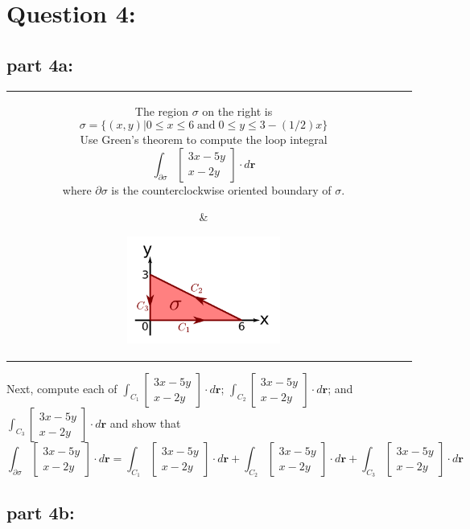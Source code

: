 \documentclass{article}
\newcommand{\colxyvec}[2]{\begin{bmatrix} #1 \\ #2 \end{bmatrix}}
\begin{document}
\section*{Question 4:}

\subsection*{part 4a:}

\begin{tabular}{cc}
\parbox{0.6\textwidth}{ 
The region \(\sigma\) on the right is 
\[\sigma = \{(x,y) | 0 \leq x \leq 6 \;\text{and}\; 0 \leq y \leq 3 - (1/2)x\}\]
Use Green's theorem to compute the loop integral
\[\int_{\partial\sigma} \colxyvec{3x-5y}{x-2y} \cdot d\mathbf{r}\]
where \(\partial\sigma\) is the counterclockwise oriented boundary of \(\sigma\).
} & \parbox{0.4\textwidth}{
\includegraphics[width = 0.4\textwidth]{Test_bench_part_4x_images/Test_bench_part_4x_image_1}
}
\end{tabular}
Next, compute each of \(\int_{C_1} \colxyvec{3x-5y}{x-2y} \cdot d\mathbf{r}\); \(\int_{C_2} \colxyvec{3x-5y}{x-2y} \cdot d\mathbf{r}\); and \(\int_{C_3} \colxyvec{3x-5y}{x-2y} \cdot d\mathbf{r}\) and show that 
\[\int_{\partial\sigma} \colxyvec{3x-5y}{x-2y} \cdot d\mathbf{r} = \int_{C_1} \colxyvec{3x-5y}{x-2y} \cdot d\mathbf{r} + \int_{C_2} \colxyvec{3x-5y}{x-2y} \cdot d\mathbf{r} + \int_{C_3} \colxyvec{3x-5y}{x-2y} \cdot d\mathbf{r}\]  



\subsection*{part 4b:}
\end{document}
